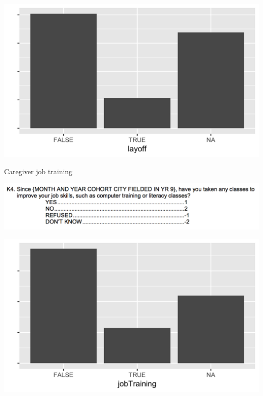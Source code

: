 \documentclass[aspectratio=169]{beamer}
\begin{document}
\begin{frame}

\centering
\includegraphics[width = .8\textwidth]{figures/layoffDist}

\end{frame}
\begin{frame}{Caregiver job training}

\centering
\includegraphics[width = .9\textwidth]{figures/jobTraining_questionnaire}

\end{frame}
\begin{frame}

\centering
\includegraphics[width = .8\textwidth]{figures/jobTrainingDist}

\end{frame}
\end{document}
